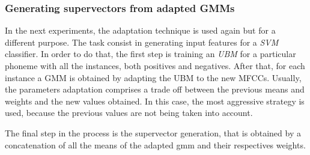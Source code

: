 \subsubsection{Generating supervectors from adapted GMMs}
	In the next experiments, the adaptation technique is used again but for a different purpose.
	The task consist in generating input features for a \textit{SVM} classifier. In order to do that,
	the first step is training an \textit{UBM} for a particular phoneme with all the 
	instances, both positives and negatives. After that, for each instance a GMM is obtained
	by adapting the UBM to the new MFCCs. Usually, the parameters adaptation comprises a trade off
	between the previous means and weights and the new values obtained. In this case,
	the most aggressive strategy is used, because the previous values are not being taken into
	account.

	The final step in the process is the supervector generation, that is obtained by a concatenation
	of all the means of the adapted gmm and their respectives weights.
	
